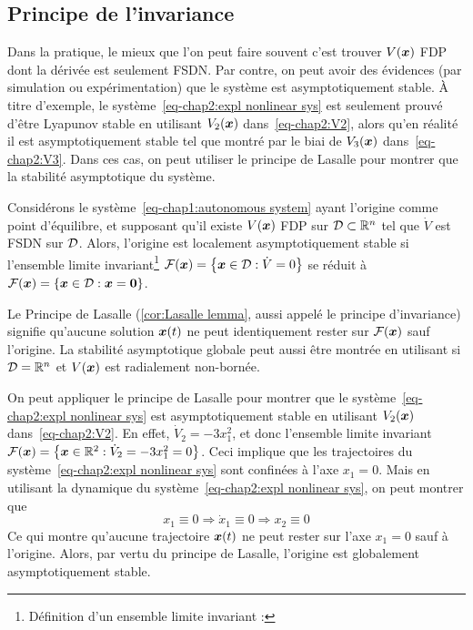 \subsection{Principe de l'invariance}
Dans la pratique, le mieux que l'on peut faire souvent c'est trouver $V(\bm{x})$ FDP dont la dérivée est seulement FSDN. Par contre, on peut avoir des évidences (par simulation ou expérimentation) que le système est asymptotiquement stable. À titre d'exemple, le système~\eqref{eq-chap2:expl nonlinear sys} est seulement prouvé d'être Lyapunov stable en utilisant $V_2(\bm{x})$ dans~\eqref{eq-chap2:V2}, alors qu'en réalité il est asymptotiquement stable tel que montré par le biai de   $V_3(\bm{x})$ dans~\eqref{eq-chap2:V3}. Dans ces cas, on peut  utiliser le principe de Lasalle pour montrer que la stabilité asymptotique du système. 
\begin{corolaire}\label{cor:Lasalle lemma}
	Considérons le système~\eqref{eq-chap1:autonomous system} ayant l'origine comme point d'équilibre, et supposant qu'il existe $V(\bm{x})$ FDP sur ${\cal D}\subset\mathbb{R}^n$ tel que $\dot{V}$ est FSDN sur ${\cal D}$. Alors, l'origine est localement asymptotiquement stable si l'ensemble limite invariant\footnote{Définition d'un ensemble limite invariant : } ${\cal F}(\bm{x})=\left\{\bm{x}\in{\cal D}: \dot{V}=0\right\}$ se réduit à  ${\cal F}(\bm{x})=\left\{\bm{x}\in{\cal D}: \bm{x}=\mathbf{0}\right\}$. 
\end{corolaire}
Le Principe de Lasalle (\cref{cor:Lasalle lemma}, aussi appelé le principe d'invariance) signifie qu'aucune solution $\bm{x}(t)$ ne peut identiquement rester sur ${\cal F}(\bm{x})$ sauf l'origine.
La stabilité asymptotique globale peut aussi être montrée en utilisant si ${\cal D}=\mathbb{R}^n$ et $V(\bm{x})$ est radialement non-bornée. 

On peut appliquer le principe de Lasalle pour montrer que le système~\eqref{eq-chap2:expl nonlinear sys} est asymptotiquement stable en utilisant $V_2(\bm{x})$ dans~\eqref{eq-chap2:V2}. En effet, $\dot{V}_2 = -3x_1^2$, et donc l'ensemble limite invariant ${\cal F}(\bm{x}) = \left\{\bm{x}\in \mathbb{R}^2:\dot{V}_2 = -3x_1^2=0\right\}$. Ceci implique que les trajectoires du système~\eqref{eq-chap2:expl nonlinear sys} sont confinées à l'axe $x_1=0$. Mais en utilisant la dynamique du système~\eqref{eq-chap2:expl nonlinear sys}, on peut montrer que  
\begin{equation*}
	x_1\equiv0 \Rightarrow \dot{x}_1\equiv0 \Rightarrow x_2\equiv0
\end{equation*}
Ce qui montre qu'aucune trajectoire $\bm{x}(t)$ ne peut rester sur l'axe $x_1=0$ sauf à l'origine. Alors, par vertu du principe de Lasalle, l'origine est globalement asymptotiquement stable.
